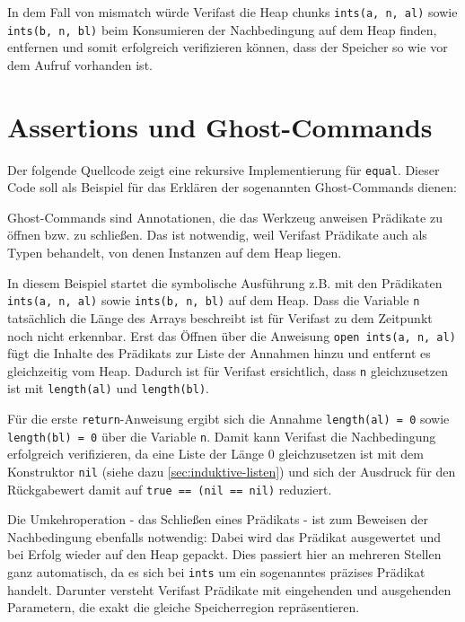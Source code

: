 In dem Fall von mismatch würde Verifast die Heap chunks \lstinline{ints(a, n, al)} sowie
\lstinline{ints(b, n, bl)} beim Konsumieren der Nachbedingung auf dem Heap finden, entfernen und
somit erfolgreich verifizieren können, dass der Speicher so wie vor dem Aufruf vorhanden ist.



\section{Assertions und Ghost-Commands}

Der folgende Quellcode zeigt eine rekursive Implementierung für \lstinline{equal}. Dieser Code
soll als Beispiel für das Erklären der sogenannten Ghost-Commands dienen:



Ghost-Commands sind Annotationen, die das Werkzeug anweisen Prädikate zu öffnen bzw. zu schließen. Das
ist notwendig, weil Verifast Prädikate auch als Typen behandelt, von denen Instanzen auf dem Heap liegen.

In diesem Beispiel startet die symbolische Ausführung z.B. mit den Prädikaten \lstinline{ints(a, n, al)} 
sowie \lstinline{ints(b, n, bl)} auf dem Heap. Dass die Variable \lstinline{n} tatsächlich die Länge
des Arrays beschreibt ist für Verifast zu dem Zeitpunkt noch nicht erkennbar. Erst das Öffnen über die
Anweisung \lstinline{open ints(a, n, al)} fügt die Inhalte des Prädikats zur Liste der Annahmen hinzu
und entfernt es gleichzeitig vom Heap. Dadurch ist für Verifast ersichtlich, dass \lstinline{n}
gleichzusetzen ist mit \texttt{length(al)} und \texttt{length(bl)}. 

Für die erste \texttt{return}-Anweisung ergibt sich die Annahme \texttt{length(al) = 0} sowie
\texttt{length(bl) = 0} über die Variable \texttt{n}. Damit kann Verifast die Nachbedingung
erfolgreich verifizieren, da eine Liste der Länge 0 gleichzusetzen ist mit dem Konstruktor
\texttt{nil} (siehe dazu \ref{sec:induktive-listen}) und sich der Ausdruck für den Rückgabewert
damit auf \texttt{true == (nil == nil)} reduziert.

Die Umkehroperation - das Schließen eines Prädikats - ist zum Beweisen der Nachbedingung ebenfalls notwendig:
Dabei wird das Prädikat ausgewertet und bei Erfolg wieder auf den Heap gepackt. Dies passiert hier an mehreren 
Stellen ganz automatisch, da es sich bei \lstinline{ints} um ein sogenanntes präzises Prädikat handelt. 
Darunter versteht Verifast Prädikate mit eingehenden und ausgehenden Parametern, die exakt die gleiche 
Speicherregion repräsentieren. 

